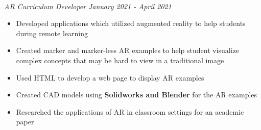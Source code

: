 \documentclass[letterpaper,20pt]{article}
\begin{document}
        \textit{}\\
        \textit{AR Curriculum Developer}\hspace{10.05 cm}
        \textit{January 2021 - April 2021} \\
        \vspace{-18pt} 
        \hspace{-3pt}
        \begin{itemize}
            \item Developed applications which utilized augmented reality to help students during remote learning \vspace{-5pt}
            \item Created marker and marker-less AR examples to help student visualize complex concepts that may be hard to view in a traditional image \vspace{-5pt}
            \item Used HTML to develop a web page to display AR examples \vspace{-5pt}
            \item Created CAD models using \textbf{Solidworks and Blender} for the AR examples  \vspace{-5pt}
            \item Researched the applications of AR in classroom settings for an academic paper
        \end{itemize}        

\end{document}
